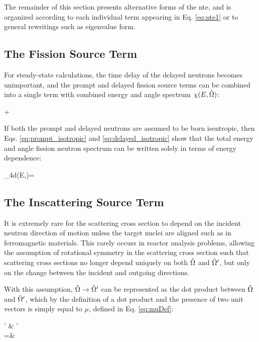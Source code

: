 The remainder of this section presents alternative forms of the \gls{nte}, and is organized according to each individual term appearing in Eq. \eqref{eq:nte1} or to general rewritings such as eigenvalue form.

\subsection{The Fission Source Term}

For steady-state calculations, the time delay of the delayed neutrons becomes unimportant, and the prompt and delayed fission source terms can be combined into a single term with combined energy and angle spectrum \(\chi(E,\hat{\Omega})\):

\beqa
\label{eq:LumpedFission}
\promptfissionsource\psi\seatprime+\delayedfissionsource\rightarrow\hspace{0.5cm}\\
\totalfissionsource\psi\seatprime
\eeqa

If both the prompt and delayed neutrons are assumed to be born isentropic, then Eqs. \eqref{eq:prompt_isotropic} and \eqref{eq:delayed_isotropic} show that the total energy and angle fission neutron spectrum can be written solely in terms of energy dependence:

\beq
\int_{4\pi}d\hO\chi(E,\hO)=
\eeq

\subsection{The Inscattering Source Term}

It is extremely rare for the scattering cross section to depend on the incident neutron direction of motion unless the target nuclei are aligned such as in ferromagnetic materials. This rarely occurs in reactor analysis problems, allowing the assumption of rotational symmetry in the scattering cross section such that scattering cross sections no longer depend uniquely on both \(\hat{\Omega}\) and \(\hat{\Omega}'\), but only on the change between the incident and outgoing directions. 

With this assumption, \(\hat{\Omega}\rightarrow\hat{\Omega}'\) can be represented as the dot product between \(\hat{\Omega}\) and \(\hat{\Omega}'\), which by the definition of a dot product and the presence of two unit vectors is simply equal to \(\mu\), defined in Eq. \eqref{eq:muDef}:

\beqa
\label{eq:OmegaDotOmega}
\hO  \cdot\hO  ' \equiv& \left\Vert\hO\right\Vert \left\Vert\hO  '\right\Vert \cos{(\theta)} \\
=&\ \mu
\eeqa

